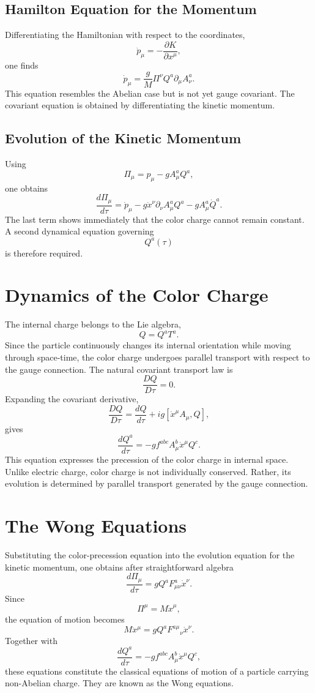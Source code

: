 \subsection{Hamilton Equation for the Momentum}
Differentiating the Hamiltonian with respect to the coordinates,
\[\dot p_\mu=-\frac{\partial K}{\partial x^\mu},\]
one finds
\[\dot p_\mu=\frac{g}{M}\Pi^\nu Q^a\partial_\mu A_\nu^a.\]
This equation resembles the Abelian case but is not yet gauge covariant.
The covariant equation is obtained by differentiating the kinetic
momentum.
\subsection{Evolution of the Kinetic Momentum}
Using
\[\Pi_\mu=p_\mu-gA_\mu^aQ^a,\]
one obtains
\[\frac{d\Pi_\mu}{d\tau}=\dot p_\mu-g\dot x^\nu\partial_\nu A_\mu^aQ^a
-gA_\mu^a\dot Q^a.\]
The last term shows immediately that the color charge cannot remain
constant.
A second dynamical equation governing
\[Q^a(\tau)\]
is therefore required.
\section{Dynamics of the Color Charge}
The internal charge belongs to the Lie algebra,
\[Q=Q^aT^a.\]
Since the particle continuously changes its internal orientation while
moving through space-time, the color charge undergoes parallel transport
with respect to the gauge connection.
The natural covariant transport law is
\[\boxed{\frac{DQ}{D\tau}=0.}\]
Expanding the covariant derivative,
\[\frac{DQ}{D\tau}=\frac{dQ}{d\tau}+ig[\dot x^\mu A_\mu,Q],\]
gives
\[\boxed{\frac{dQ^a}{d\tau}=-gf^{abc}A_\mu^b\dot x^\mu Q^c.}\]
This equation expresses the precession of the color charge in internal
space.
Unlike electric charge,
color charge is not individually conserved.
Rather,
its evolution is determined by parallel transport generated by the gauge
connection.
\section{The Wong Equations}
Substituting the color-precession equation into the evolution equation
for the kinetic momentum, one obtains after straightforward algebra
\[\boxed{\frac{d\Pi_\mu}{d\tau}=gQ^aF_{\mu\nu}^a\dot x^\nu.}\]
Since
\[\Pi^\mu=M\dot x^\mu,\]
the equation of motion becomes
\[\boxed{M\ddot x^\mu=gQ^aF^{a\mu}{}_{\nu}\dot x^\nu.}\]
Together with
\[\boxed{\frac{dQ^a}{d\tau}=-gf^{abc}A_\mu^b\dot x^\mu Q^c,}\]
these equations constitute the classical equations of motion of a
particle carrying non-Abelian charge.
They are known as the Wong equations.
